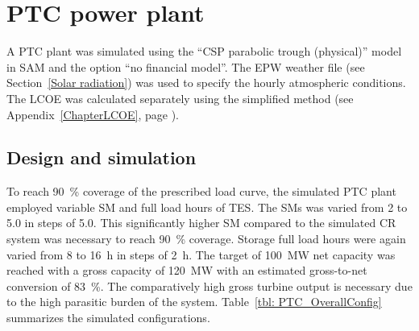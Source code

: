 \chapter{PTC power plant}

A \ac{PTC} plant was simulated using the \enquote{CSP parabolic trough (physical)} model in \ac{SAM} and the option \enquote{no financial model}. The EPW weather file (see Section~\ref{Solar radiation}) was used to specify the hourly atmospheric conditions. 
The \ac{LCOE} was calculated separately using the simplified method (see Appendix~\ref{ChapterLCOE}, page \pageref{ChapterLCOE}).

\section{Design  and simulation} \label{PTC power plant design  and simulation}


To reach \SI{90}{\percent} coverage of the prescribed load curve, the simulated \ac{PTC} plant employed variable \ac{SM} and full load hours of \ac{TES}. The \acp{SM} was varied from \num{2} to \num{5.0} in steps of \num{5.0}. This significantly higher \ac{SM} compared to the simulated \ac{CR} system was necessary to reach \SI{90}{\percent} coverage. Storage full load hours were again varied from \si{8} to \SI{16}{h} in steps of \SI{2}{h}. The target of \SI{100}{MW} net capacity was reached with a gross capacity of \SI{120}{MW} with an estimated gross-to-net conversion of \SI{83}{\percent}. The comparatively high gross turbine output is necessary due to the high parasitic burden of the system. Table~\ref{tbl: PTC_OverallConfig} summarizes the simulated configurations.


